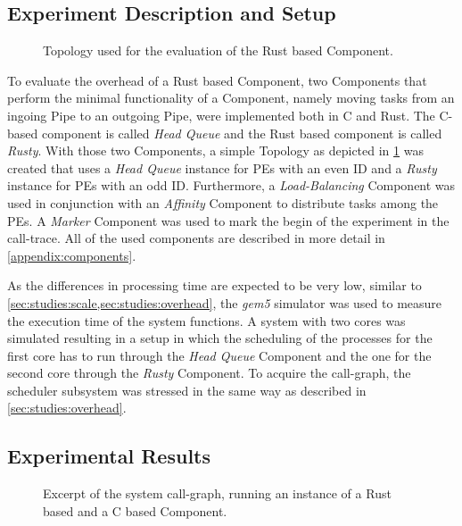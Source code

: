 \subsection{Experiment Description and Setup}%
\label{sec:study:rust:setup}

\begin{figure}[!b] \centering
	\caption{Topology used for the evaluation of the Rust based Component.}%
	\label{fig:eval:rust-topo}
\end{figure}

To evaluate the overhead of a Rust based Component, two Components that perform the minimal functionality of a \cobas{} Component, namely moving tasks from an ingoing Pipe to an outgoing Pipe, were implemented both in C and Rust. The C-based component is called \emph{Head Queue} and the Rust based component is called \emph{Rusty}. With those two Components, a simple Topology as depicted in \cref{fig:eval:rust-topo} was created that uses a \emph{Head Queue} instance for \acp{PE} with an even ID and a \emph{Rusty} instance for \acp{PE} with an odd ID. Furthermore, a \emph{Load-Balancing} Component was used in conjunction with an \emph{Affinity} Component to distribute tasks among the \acp{PE}. A \emph{Marker} Component was used to mark the begin of the experiment in the call-trace. All of the used components are described in more detail in \cref{appendix:components}.

As the differences in processing time are expected to be very low, similar to \cref{sec:studies:scale,sec:studies:overhead}, the \emph{gem5} simulator was used to measure the execution time of the system functions. A system with two cores was simulated resulting in a setup in which the scheduling of the processes for the first core has to run through the \emph{Head Queue} Component and the one for the second core through the \emph{Rusty} Component. To acquire the call-graph, the scheduler subsystem was stressed in the same way as described in \cref{sec:studies:overhead}.

\subsection{Experimental Results}%
\label{sec:study:rust:results}

\begin{sidewaysfigure} \centering
	\caption[Excerpt of the system call-graph with a Rust based Component.]{Excerpt of the system call-graph, running an instance of a Rust based and a C based \cobas{} Component.}%
	\label{fig:eval:rust}
\end{sidewaysfigure}

